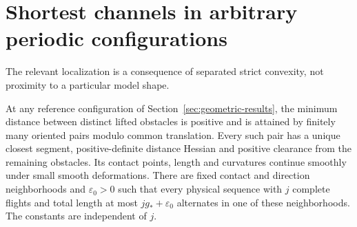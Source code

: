 \section{Shortest channels in arbitrary periodic configurations}
\label{sec:g-localization}
The relevant localization is a consequence of separated strict
convexity, not proximity to a particular model shape.

\begin{lemma}
\label{lem:g-channels}
At any reference configuration of Section~\ref{sec:geometric-results},
the minimum distance between distinct lifted obstacles is positive and
is attained by finitely many oriented pairs modulo common translation.
Every such pair has a unique closest segment, positive-definite distance
Hessian and positive clearance from the remaining obstacles. Its contact
points, length and curvatures continue smoothly under small smooth
deformations. There are fixed contact and direction neighborhoods and
$\varepsilon_0>0$ such that every physical sequence with $j$ complete
flights and total length at most $jg_*+\varepsilon_0$ alternates in one
of these neighborhoods. The constants are independent of $j$.
\end{lemma}
